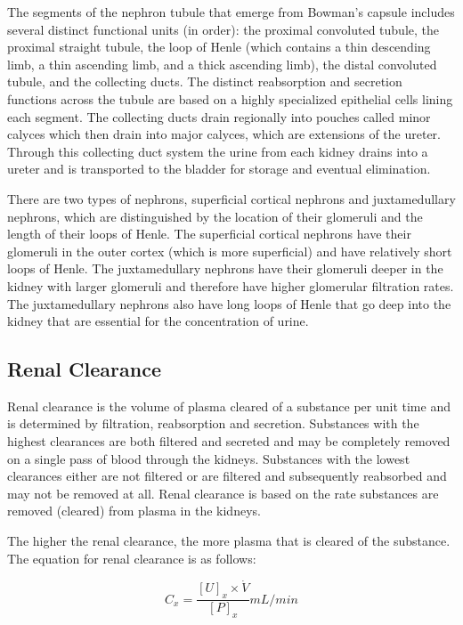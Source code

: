 The segments of the nephron tubule that emerge from Bowman’s capsule includes several distinct functional units (in order): the proximal convoluted tubule, the proximal straight tubule, the loop of Henle (which contains a thin descending limb, a thin ascending limb, and a thick ascending limb), the distal convoluted tubule, and the collecting ducts. The distinct reabsorption and secretion functions across the tubule are based on a highly specialized epithelial cells lining each segment. The collecting ducts drain regionally into pouches called minor calyces which then drain into major calyces, which are extensions of the ureter. Through this collecting duct system the urine from each kidney drains into a ureter and is transported to the bladder for storage and eventual elimination.

There are two types of nephrons, superficial cortical nephrons and juxtamedullary nephrons, which are distinguished by the location of their glomeruli and the length of their loops of Henle. The superficial cortical nephrons have their glomeruli in the outer cortex (which is more superficial) and have relatively short loops of Henle. The juxtamedullary nephrons have their glomeruli deeper in the kidney with larger glomeruli and therefore have higher glomerular filtration rates. The juxtamedullary nephrons also have long loops of Henle that go deep into the kidney that are essential for the concentration of urine. 

\subsection{Renal Clearance}

Renal clearance is the volume of plasma cleared of a substance per unit time and is determined by filtration, reabsorption and secretion. Substances with the highest clearances are both filtered and secreted and may be completely removed on a single pass of blood through the kidneys. Substances with the lowest clearances either are not filtered or are filtered and subsequently reabsorbed and may not be removed at all.  Renal clearance is based on the rate substances are removed (cleared) from plasma in the kidneys.

The higher the renal clearance, the more plasma that is cleared of the substance. The equation for renal clearance is as follows:

\begin{equation}
    C_x = \frac{[U]_x \times \dot{V}}{[P]_x} mL/min
    \label{renal_clearance}
\end{equation}

